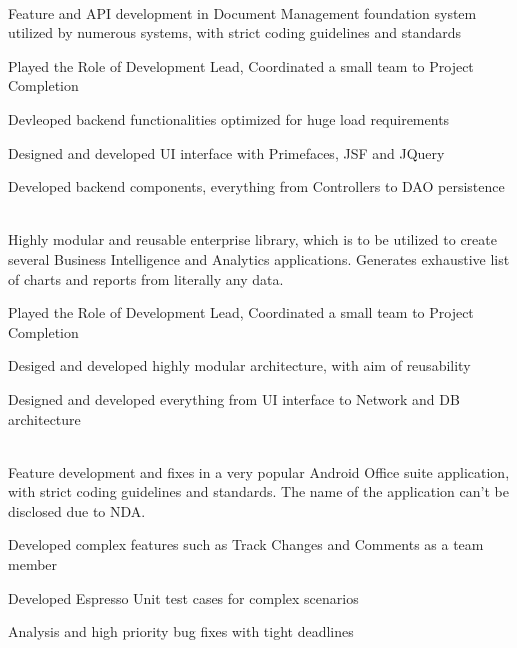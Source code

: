 \documentclass[]{deedy-resume-openfont}
\begin{document}
\hfill {}\\
Feature and API development in Document Management foundation system utilized by numerous systems, with strict coding guidelines and standards\\
\begin{tightemize}
	\item Played the Role of Development Lead, Coordinated a small team to Project Completion
	\item Devleoped backend functionalities optimized for huge load requirements
	\item Designed and developed UI interface with Primefaces, JSF and JQuery
	\item Developed backend components, everything from Controllers to DAO persistence
\end{tightemize}
\sectionsep
  
\clearpage
{}
\hfill {}\\
Highly modular and reusable enterprise library, which is to be utilized to create several Business Intelligence and Analytics applications. Generates exhaustive list of charts and reports from literally any data.\\
\begin{tightemize}
	\item Played the Role of Development Lead, Coordinated a small team to Project Completion
	\item Desiged and developed highly modular architecture, with aim of reusability
	\item Designed and developed everything from UI interface to Network and DB architecture
\end{tightemize}
\sectionsep
  

\\
Feature development and fixes in a very popular Android Office suite application, with strict coding guidelines and standards. The name of the application can’t be disclosed due to NDA.\\
\begin{tightemize}
	\item Developed complex features such as Track Changes and Comments as a team member
	\item Developed Espresso Unit test cases for complex scenarios
	\item Analysis and high priority bug fixes with tight deadlines
\end{tightemize}
\sectionsep
%
%
\end{document}
